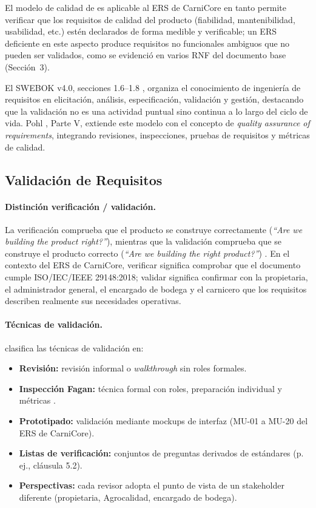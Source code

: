 \documentclass[11pt,a4paper]{article}
\begin{document}
El modelo de calidad de \cite{iso25010} es aplicable al ERS de CarniCore en tanto permite verificar que los requisitos de calidad del producto (fiabilidad, mantenibilidad, usabilidad, etc.) estén declarados
de forma medible y verificable; un ERS deficiente en este aspecto produce requisitos no
funcionales ambiguos que no pueden ser validados, como se evidenció en varios RNF del documento base (Sección~3).

El SWEBOK v4.0, secciones 1.6--1.8 \cite{swebok2024}, organiza el conocimiento de ingeniería de
requisitos en elicitación, análisis, especificación, validación y gestión, destacando que la
validación no es una actividad puntual sino continua a lo largo del ciclo de vida. Pohl
\cite{pohl2010}, Parte V, extiende este modelo con el concepto de \textit{quality assurance of requirements},
integrando revisiones, inspecciones, pruebas de requisitos y métricas de calidad.

\subsection{Validación de Requisitos}
\paragraph{Distinción verificación / validación.}
La verificación comprueba que el producto se construye correctamente (\textit{“Are we building the product right?”}), mientras que la validación comprueba que se construye el producto correcto (\textit{“Are we building the right product?”}) \cite{wiegers2013}. En el contexto del ERS de CarniCore, verificar
significa comprobar que el documento cumple ISO/IEC/IEEE 29148:2018; validar significa confirmar con la propietaria, el administrador general, el encargado de bodega y el carnicero que los requisitos describen realmente sus necesidades operativas.

\paragraph{Técnicas de validación.} \cite{pohl2010} clasifica las técnicas de validación en:
\begin{itemize}[nosep]
\item \textbf{Revisión:} revisión informal o \textit{walkthrough} sin roles formales.
\item \textbf{Inspección Fagan:} técnica formal con roles, preparación individual y métricas \cite{fagan1976}.
\item \textbf{Prototipado:} validación mediante mockups de interfaz (MU-01 a MU-20 del ERS de CarniCore).
\item \textbf{Listas de verificación:} conjuntos de preguntas derivados de estándares (p.\,ej., \cite{iso29148} cláusula 5.2).
\item \textbf{Perspectivas:} cada revisor adopta el punto de vista de un stakeholder diferente (propietaria, Agrocalidad, encargado de bodega).
\end{itemize}
\end{document}
